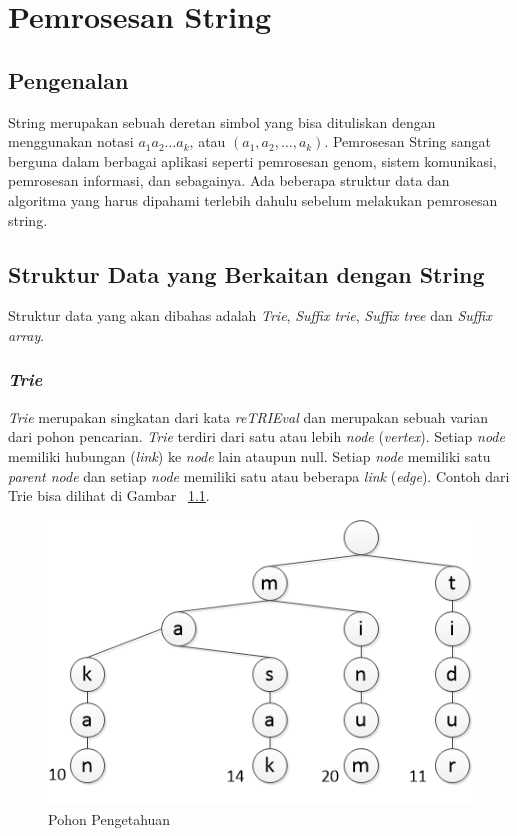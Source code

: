 \chapter{Pemrosesan String}

\section{Pengenalan}

String merupakan sebuah deretan simbol yang bisa dituliskan dengan menggunakan notasi $a_1 a_2 \ldots a_k$, atau $(a_1, a_2, \ldots , a_k)$. Pemrosesan String sangat berguna dalam berbagai aplikasi seperti pemrosesan genom, sistem komunikasi, pemrosesan informasi, dan sebagainya. Ada beberapa struktur data dan algoritma yang harus dipahami terlebih dahulu sebelum melakukan pemrosesan string.  

\section{Struktur Data yang Berkaitan dengan String}
Struktur data yang akan dibahas adalah \textit{Trie}, \textit{Suffix trie}, \textit{Suffix tree} dan \textit{Suffix array}.

\subsection{\textit{Trie}}
\textit{Trie} merupakan singkatan dari kata \textit{reTRIEval} dan merupakan sebuah varian dari pohon pencarian. \textit{Trie} terdiri dari satu atau lebih \textit{node} (\textit{vertex}). Setiap \textit{node} memiliki hubungan (\textit{link}) ke \textit{node} lain ataupun null. Setiap \textit{node} memiliki satu \textit{parent node} dan setiap \textit{node} memiliki satu atau beberapa \textit{link} (\textit{edge}). Contoh dari Trie bisa dilihat di Gambar ~\ref{fig:trie}.

\begin{figure}
    \includegraphics[width=\textwidth,keepaspectratio]{fig/Trie.png}%
	\caption{Pohon Pengetahuan}%
	\label{fig:trie}%
\end{figure}

